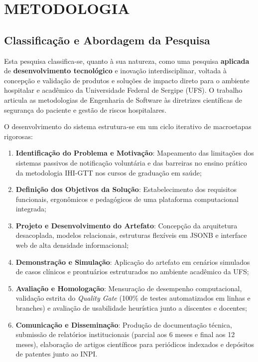 \chapter{METODOLOGIA}
\label{cap:metodologia}

\section{Classificação e Abordagem da Pesquisa}
\label{sec:classificacao-pesquisa}

Esta pesquisa classifica-se, quanto à sua natureza, como uma pesquisa \textbf{aplicada} de \textbf{desenvolvimento tecnológico} e inovação interdisciplinar, voltada à concepção e validação de produtos e soluções de impacto direto para o ambiente hospitalar e acadêmico da Universidade Federal de Sergipe (UFS). O trabalho articula as metodologias de Engenharia de Software às diretrizes científicas de segurança do paciente e gestão de riscos hospitalares.

O desenvolvimento do sistema estrutura-se em um ciclo iterativo de macroetapas rigorosas:
\begin{enumerate}
    \item \textbf{Identificação do Problema e Motivação}: Mapeamento das limitações dos sistemas passivos de notificação voluntária e das barreiras no ensino prático da metodologia IHI-GTT nos cursos de graduação em saúde;
    \item \textbf{Definição dos Objetivos da Solução}: Estabelecimento dos requisitos funcionais, ergonômicos e pedagógicos de uma plataforma computacional integrada;
    \item \textbf{Projeto e Desenvolvimento do Artefato}: Concepção da arquitetura desacoplada, modelos relacionais, estruturas flexíveis em JSONB e interface web de alta densidade informacional;
    \item \textbf{Demonstração e Simulação}: Aplicação do artefato em cenários simulados de casos clínicos e prontuários estruturados no ambiente acadêmico da UFS;
    \item \textbf{Avaliação e Homologação}: Mensuração de desempenho computacional, validação estrita do \textit{Quality Gate} (100\% de testes automatizados em linhas e branches) e avaliação de usabilidade heurística junto a discentes e docentes;
    \item \textbf{Comunicação e Disseminação}: Produção de documentação técnica, submissão de relatórios institucionais (parcial aos 6 meses e final aos 12 meses), elaboração de artigos científicos para periódicos indexados e depósitos de patentes junto ao INPI.
\end{enumerate}

